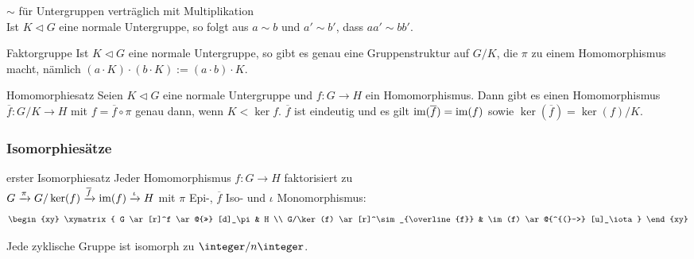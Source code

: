 \linie

\begin{Lemma}{$\sim$ für Untergruppen verträglich mit Multiplikation}\\
    Ist $K \vartriangleleft G$ eine normale Untergruppe, so folgt aus
    $a \sim b$ und $a' \sim b'$, dass $aa' \sim bb'$.
\end{Lemma}

\begin{Satz}{Faktorgruppe}
    Ist $K \vartriangleleft G$ eine normale Untergruppe, so gibt es genau
    eine Gruppenstruktur auf $G/K$, die $\pi$ zu einem Homomorphismus macht,
    nämlich $(a \cdot K) \cdot (b \cdot K) := (a \cdot b) \cdot K$.
\end{Satz}

\linie

\begin{Satz}{Homomorphiesatz}
    Seien $K \vartriangleleft G$ eine normale Untergruppe und
    $f\colon G \rightarrow H$ ein Homomorphismus.
    Dann gibt es einen Homomorphismus $\overline{f}\colon G/K \rightarrow H$
    mit $f = \overline{f} \circ \pi$ genau dann, wenn $K < \ker f$.
    $\overline{f}$ ist eindeutig und es gilt $\text{im}(\overline{f}) = \text{im}(f)$
    sowie $\ker(\overline{f}) = \ker(f) / K$.
\end{Satz}

\pagebreak

\subsubsection{%
    Isomorphiesätze%
}

\begin{Satz}{erster Isomorphiesatz}
    Jeder Homomorphismus $f\colon G \rightarrow H$ faktorisiert zu \\
    $G \xrightarrow{\pi} G/\ker(f) \xrightarrow{\overline{f}} \text{im}(f)
    \xrightarrow{\iota} H$
    mit $\pi$ Epi-, $\overline{f}$ Iso- und $\iota$ Monomorphismus:
    \begin{align*}
        \begin{xy}
            \xymatrix{
                G \ar[r]^f \ar @{>>} [d]_\pi &
                H \\
                G/\ker(f) \ar[r]^\sim_{\overline{f}} &
                \im(f) \ar @{^{(}->} [u]_\iota
            }
        \end{xy}
    \end{align*}
\end{Satz}

\begin{Kor}
    Jede zyklische Gruppe ist isomorph zu $\integer/n\integer$.
\end{Kor}

